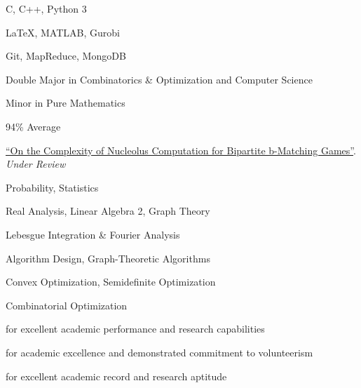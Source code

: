 \small
C, C++, Python 3

\smallskip

\LaTeX, MATLAB, Gurobi

\divider\smallskip

Git, MapReduce, MongoDB

\small
Double Major in Combinatorics \& Optimization and  Computer Science

\smallskip

Minor in Pure Mathematics

\smallskip

94\% Average

\small
\href{https://arxiv.org/abs/2105.07161}{``On the Complexity of Nucleolus Computation for Bipartite b-Matching Games''}.
\emph{Under Review}

\small
Probability, Statistics

\smallskip

Real Analysis, Linear Algebra 2, Graph Theory

\smallskip

Lebesgue Integration \& Fourier Analysis

\divider\smallskip

Algorithm Design, Graph-Theoretic Algorithms

\smallskip

Convex Optimization, Semidefinite Optimization

\smallskip

Combinatorial Optimization

\small
{}\small
for excellent academic performance and research capabilities

\divider\smallskip

\small
for academic excellence and demonstrated commitment to volunteerism

\divider\smallskip

\small
for excellent academic record and research aptitude

\iffalse
\divider\smallskip

\cvevent{President's Research Award}{University of Waterloo}{September 2020}{}

\divider\smallskip

\cvevent{President's Scholarship of Distinction}{University of Waterloo}{September 2017}{}
for entrance average above 95\%
\fi

